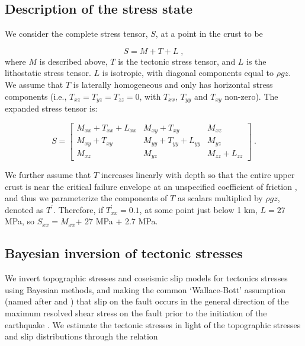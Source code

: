 \documentclass[draft,jgrga]{AGUTeX}
\begin{document}
\begin{article}
\subsection{Description of the stress
state}\label{description-of-the-stress-state}

We consider the complete stress tensor, $S$, at a point in the crust to
be

\begin{equation}
S = M + T + L \; ,
\end{equation}
where $M$ is described above, $T$ is the tectonic stress tensor, and $L$
is the lithostatic stress tensor. $L$ is isotropic, with diagonal
components equal to $\rho g z$. We assume that $T$ is laterally
homogeneous and only has horizontal stress components (i.e.,
$T_{xz} = T_{yz} = T_{zz} = 0$, with $T_{xx}$, $T_{yy}$ and $T_{xy}$
non-zero). The expanded stress tensor is:

\begin{equation}
S = \begin{bmatrix}
  M_{xx} + T_{xx} + L_{xx} & M_{xy} + T_{xy} &  M_{xz} \\
	M_{xy} + T_{xy} &  M_{yy} + T_{yy} + L_{yy} & M_{yz} \\
	M_{xz}     &  M_{yz}  &  M_{zz} + L_{zz}
	\end{bmatrix} \; .
\label{eqn:stress_tensor}
\end{equation}

We further assume that $T$ increases linearly with depth so
that the entire upper crust is near the critical failure envelope
at an unspecified coefficient of friction
\citep[e.g.,][]{townend2000}, and thus we parameterize the components of $T$
as scalars multiplied by $\rho g z$, denoted as $T^\prime$. Therefore, if
$T^\prime_{xx} = 0.1$, at some point just below 1 km, $L=27$ MPa, so
$S_{xx} = M_{xx}$+ 27 MPa + 2.7 MPa.

\subsection{Bayesian inversion of tectonic
stresses}\label{bayesian-inversion-of-tectonic-stresses}

We invert topographic stresses and coseismic slip models for tectonics
stresses using Bayesian methods, and making the common `Wallace-Bott'
assumption (named after \citet{wallace1951} and \citet{bott1959}) that
slip on the fault occurs in the general direction of the maximum
resolved shear stress on the fault prior to the initiation of the
earthquake \citep[e.g.,][] {mckenzie1969, angelier1994}. We estimate
the tectonic stresses in light of the topographic stresses and slip
distributions through the relation


\end{article}
\end{document}
